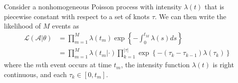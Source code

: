 \documentclass{article}
\begin{document}
Consider a nonhomogeneous Poisson process with  intensity $\lambda(t)$ that is piecewise constant with respect to a set of knots $\tau$.  We can then write the likelihood of $M$ events as
\begin{align}
\mathcal{L}(\mathcal{A}|\theta) &= \prod_{m=1}^M \lambda(t_m) \exp\left\{ - \int_{0}^{t_M} \lambda(s)ds \right\} \\
&= \prod_{m=1}^M \lambda(t_m|\cdot) \prod_{k=1}^{|\tau|} \exp\left\{ - (\tau_{k} - \tau_{k-1}) \lambda(\tau_k) \right\}
\end{align}
\noindent where the $m$th event occurs at time $t_m$, the intensity function $\lambda(t)$ is right continuous, and each $\tau_k \in [0,t_m]$.
\end{document}
